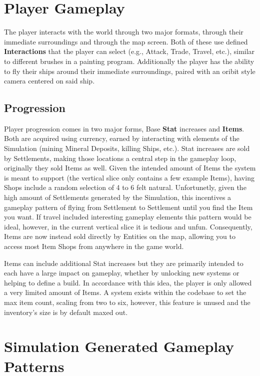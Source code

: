 \documentclass{report}
\begin{document}
\section{Player Gameplay}

The player interacts with the world through two major formats, through their immediate surroundings and through the map screen. Both of these use defined \textbf{Interactions} that the player can select (e.g., Attack, Trade, Travel, etc.), similar to different brushes in a painting program. Additionally the player has the ability to fly their ships around their immediate surroundings, paired with an oribit style camera centered on said ship.

\subsection{Progression}

Player progression comes in two major forms, Base \textbf{Stat} increases and \textbf{Items}. Both are acquired using currency, earned by interacting with elements of the Simulation (mining Mineral Deposits, killing Ships, etc.). Stat increases are sold by Settlements, making those locations a central step in the gameplay loop, originally they sold Items as well. Given the intended amount of Items the system is meant to support (the vertical slice only contains a few example Items), having Shops include a random selection of 4 to 6 felt natural. Unfortunetly, given the high amount of Settlements generated by the Simulation, this incentives a gameplay pattern of flying from Settlement to Settlement until you find the Item you want. If travel included interesting gameplay elements this pattern would be ideal, however, in the current vertical slice it is tedious and unfun. Consequently, Items are now instead sold  directly by Entities on the map, allowing you to access most Item Shops from anywhere in the game world.

Items can include additional Stat increases but they are primarily intended to each have a large impact on gameplay, whether by unlocking new systems or helping to define a build. In accordance with this idea, the player is only allowed a very limited amount of Items. A system exists within the codebase to set the max item count, scaling from two to six, however, this feature is unused and the inventory's size is by default maxed out.

\section{Simulation Generated Gameplay Patterns}
\end{document}

